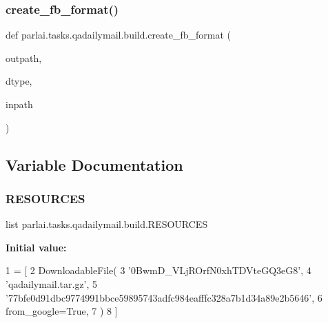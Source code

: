 \mbox{\label{namespaceparlai_1_1tasks_1_1qadailymail_1_1build_a91296a105f8b2d3f5c53d34282cf6e62}} 
\subsubsection{\texorpdfstring{create\+\_\+fb\+\_\+format()}{create\_fb\_format()}}
{\footnotesize\ttfamily def parlai.\+tasks.\+qadailymail.\+build.\+create\+\_\+fb\+\_\+format (\begin{DoxyParamCaption}\item[{}]{outpath,  }\item[{}]{dtype,  }\item[{}]{inpath }\end{DoxyParamCaption})}



\subsection{Variable Documentation}
\mbox{\label{namespaceparlai_1_1tasks_1_1qadailymail_1_1build_aa458d08dd58129a0b107f338e714f439}} 
\subsubsection{\texorpdfstring{R\+E\+S\+O\+U\+R\+C\+ES}{RESOURCES}}
{\footnotesize\ttfamily list parlai.\+tasks.\+qadailymail.\+build.\+R\+E\+S\+O\+U\+R\+C\+ES}

{\bfseries Initial value\+:}
\begin{DoxyCode}
1 =  [
2     DownloadableFile(
3         \textcolor{stringliteral}{'0BwmD\_VLjROrfN0xhTDVteGQ3eG8'},
4         \textcolor{stringliteral}{'qadailymail.tar.gz'},
5         \textcolor{stringliteral}{'77bfe0d91dbc9774991bbce59895743adfc984eafffc328a7b1d34a89e2b5646'},
6         from\_google=\textcolor{keyword}{True},
7     )
8 ]
\end{DoxyCode}
